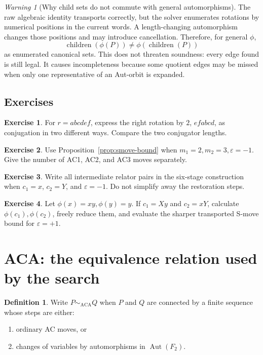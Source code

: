 \documentclass[11pt]{article}
\theoremstyle{definition}
\newtheorem{definition}[theorem]{Definition}
\newtheorem{exercise}{Exercise}[section]
\theoremstyle{remark}
\newtheorem{warning}[theorem]{Warning}
\newcommand{\F}{F_2}
\newcommand{\Aut}{\operatorname{Aut}}
\newcommand{\ACA}{\mathrm{ACA}}
\newcommand{\eps}{\varepsilon}
\begin{document}
\begin{warning}[Why child sets do not commute with general automorphisms]
The raw algebraic identity transports correctly, but the solver enumerates
rotations by numerical positions in the current words.  A length-changing
automorphism changes those positions and may introduce cancellation.
Therefore, for general \(\phi\),
\[
  \operatorname{children}(\phi(P))
  \ne
  \phi(\operatorname{children}(P))
\]
as enumerated canonical sets.  This does not threaten soundness: every
edge found is still legal.  It causes incompleteness because some quotient
edges may be missed when only one representative of an Aut-orbit is
expanded.
\end{warning}

\subsection*{Exercises}

\begin{exercise}
For \(r=abcdef\), express the right rotation by \(2\), \(efabcd\), as
conjugation in two different ways.  Compare the two conjugator lengths.
\end{exercise}

\begin{exercise}
Use Proposition~\ref{prop:smove-bound} when
\(m_1=2,m_2=3,\eps=-1\).  Give the number of AC1, AC2, and AC3 moves
separately.
\end{exercise}

\begin{exercise}
Write all intermediate relator pairs in the six-stage construction when
\(c_1=x\), \(c_2=Y\), and \(\eps=-1\).  Do not simplify away the restoration
steps.
\end{exercise}

\begin{exercise}
Let \(\phi(x)=xy,\phi(y)=y\).  If \(c_1=Xy\) and \(c_2=xY\), calculate
\(\phi(c_1),\phi(c_2)\), freely reduce them, and evaluate the sharper
transported S-move bound for \(\eps=+1\).
\end{exercise}

\section{ACA: the equivalence relation used by the search}
\label{sec:aca}

\begin{definition}
Write \(P\sim_{\ACA}Q\) when \(P\) and \(Q\) are connected by a finite
sequence whose steps are either:
\begin{enumerate}
  \item ordinary AC moves, or
  \item changes of variables by automorphisms in \(\Aut(\F)\).
\end{enumerate}
\end{definition}
\end{document}
